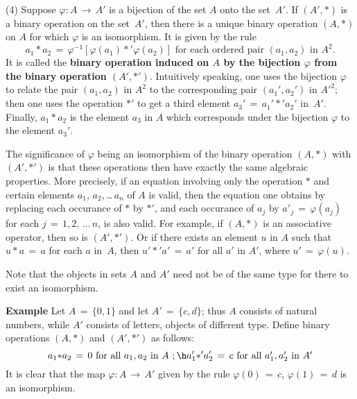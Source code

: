         (4) Suppose ${\varphi}:A \,{\rightarrow}\, A'$ is a bijection of the set $A$ onto the set~$A'$. If $(A',{\ast})$ is a binary operation on the set~$A'$, 
    then there is a unique binary operation $(A,{\ast})$ on $A$ for which ${\varphi}$ is an isomorphism. It is given by the rule
        \begin{displaymath}
        a_{1}{\ast}a_{2} \,=\, {\varphi}^{-1}[{\varphi}(a_{1}){\ast}'{\varphi}(a_{2})] \mbox{ for each ordered pair $(a_{1},a_{2})$ in $A^{2}$}.
        \end{displaymath}
    It is called the {\bf binary operation induced on $A$ by the bijection ${\varphi}$ from the binary operation $(A',{\ast}')$}.
    Intuitively speaking, one uses the bijection ${\varphi}$ to relate the pair $(a_{1},a_{2})$ in $A^{2}$
    to the corresponding pair $(a_{1}',a_{2}')$ in $A'^{2}$;
    then one uses the operation ${\ast}'$ to get a third element $a_{3}' \,=\, a_{1}'{\ast}'a_{2}'$ in~$A'$.
    Finally, $a_{1}{\ast}a_{2}$ is the element $a_{3}$ in $A$ which corresponds under the bijection ${\varphi}$ to the element $a_{3}'$.

\VV

        The significance of ${\varphi}$ being an isomorphism of the binary operation $(A,{\ast})$ with $(A',{\ast}')$
    is that these operations then have exactly the same algebraic properties. More precisely, if an equation involving only the operation ${\ast}$ and certain elements $a_{1}$, $a_{2}$,\,{\ldots}\,$a_{n}$ of $A$ is valid,
    then the equation one obtains by replacing each occurance of ${\ast}$ by ${\ast}'$,
    and each occurance of $a_{j}$ by $a'_{j} \,=\, {\varphi}(a_{j})$ for each $j \,=\, 1,2,\,{\ldots}\,n$, is also valid.
    For example, if $(A,{\ast})$ is an associative operator, then so is $(A',{\ast}')$.
    Or if there exists an element $u$ in $A$ such that $u{\ast}a \,=\, a$ for each $a$ in~$A$,
    then $u'{\ast}'a' \,=\, a'$ for all $a'$ in $A'$, where $u' \,=\, {\varphi}(u)$.

\V

    Note that the objects in sets $A$ and $A'$ need not be of the same type for there to exist an isomorphism.

        {\bf Example} Let $A \,=\, \{0,1\}$ and let $A' \,=\, \{c,d\}$; thus $A$ consists of natural numbers,
    while $A'$ consists of letters, objects of different type.  Define binary operations $(A,{\ast})$ and $(A',{\ast}')$ as follows:
        \begin{displaymath}
        a_{1}{\ast}a_{2} \,=\, 0 \mbox{ for all $a_{1}, a_{2}$ in $A$ }; \h
        a_{1}'{\ast}'a_{2}' \,=\, c \mbox{ for all $a_{1}', a_{2}'$ in $A'$}
        \end{displaymath}
    It is clear that the map ${\varphi}:A \,{\rightarrow}\, A'$ given by the rule ${\varphi}(0) \,=\, c$, ${\varphi}(1) \,=\, d$ is an isomorphism.

